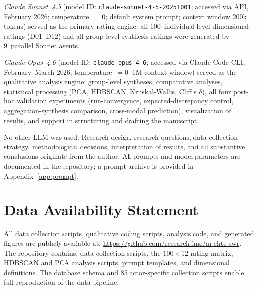 \documentclass[12pt,a4paper]{article}
\begin{document}
\emph{Claude Sonnet~4.5} (model ID: \texttt{claude-sonnet-4-5-20251001}; accessed via API, February 2026; temperature~$= 0$; default system prompt; context window 200k tokens) served as the primary rating engine: all 100~individual-level dimensional ratings (D01--D12) and all group-level synthesis ratings were generated by 9~parallel Sonnet agents.

\emph{Claude Opus~4.6} (model ID: \texttt{claude-opus-4-6}; accessed via Claude Code CLI, February--March 2026; temperature~$= 0$; 1M context window) served as the qualitative analysis engine: group-level syntheses, comparative analyses, statistical processing (PCA, HDBSCAN, Kruskal-Wallis, Cliff's $\delta$), all four post-hoc validation experiments (run-convergence, expected-discrepancy control, aggregation-synthesis comparison, cross-modal prediction), visualization of results, and support in structuring and drafting the manuscript.

No other LLM was used. Research design, research questions, data collection strategy, methodological decisions, interpretation of results, and all substantive conclusions originate from the author. All prompts and model parameters are documented in the repository; a prompt archive is provided in Appendix~\ref{app:prompt}.




\section*{Data Availability Statement}

\noindent All data collection scripts, qualitative coding scripts, analysis code, and generated figures are publicly available at: \url{https://github.com/research-line/ai-elite-swr}. The repository contains: data collection scripts, the $100\times12$ rating matrix, HDBSCAN and PCA analysis scripts, prompt templates, and dimensional definitions. The database schema and 85 actor-specific collection scripts enable full reproduction of the data pipeline.

\newpage
\end{document}
